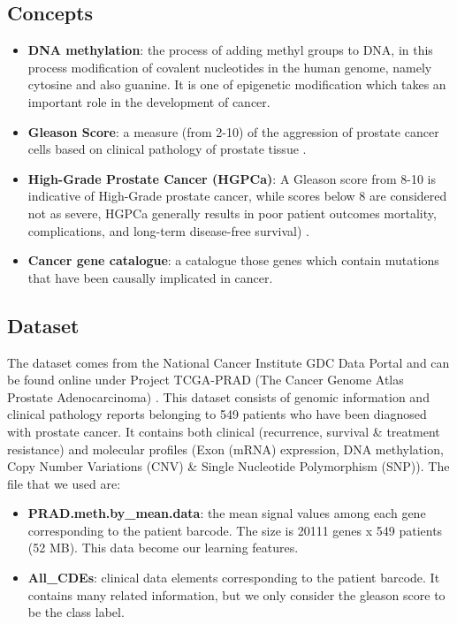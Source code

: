 \documentclass[a4paper,oneside]{article}
\begin{document}
\subsection{Concepts}
\begin{itemize}
\item \textbf{DNA methylation}: the process of adding methyl groups to DNA, in this process modification of covalent nucleotides in the human genome, namely cytosine and also guanine. It is one of epigenetic modification which takes an important role in the development of cancer.
\item \textbf{Gleason Score}: a measure (from 2-10) of the aggression of prostate cancer cells based on clinical pathology of prostate tissue \cite{prostate}.
\item \textbf{High-Grade Prostate Cancer (HGPCa)}: A Gleason score from 8-10 is indicative of High-Grade prostate cancer, while scores below 8 are considered not as severe, HGPCa generally results in poor patient outcomes mortality, complications, and long-term disease-free survival) \cite{prostate}.
\item \textbf{Cancer gene catalogue}: a catalogue those genes which contain mutations that have been causally implicated in cancer.
\end{itemize}

\subsection{Dataset}
The dataset comes from the National Cancer Institute GDC Data Portal and can be found online under Project TCGA-PRAD (The Cancer Genome Atlas Prostate Adenocarcinoma) \cite{praddata}. This dataset consists of genomic information and clinical pathology reports belonging to 549 patients who have been diagnosed with prostate cancer. It contains both clinical (recurrence, survival \& treatment resistance) and molecular profiles (Exon (mRNA) expression, DNA methylation, Copy Number Variations (CNV) \& Single Nucleotide Polymorphism (SNP)). The file that we used are:
\begin{itemize}
\item \textbf{PRAD.meth.by\_mean.data}: the mean signal values among each gene corresponding to the patient barcode. The size is 20111 genes x 549 patients (52 MB). This data become our learning features.
\item \textbf{All\_CDEs}: clinical data elements corresponding to the patient barcode. It contains many related information, but we only consider the gleason score to be the class label.
\end{itemize}
\end{document}
